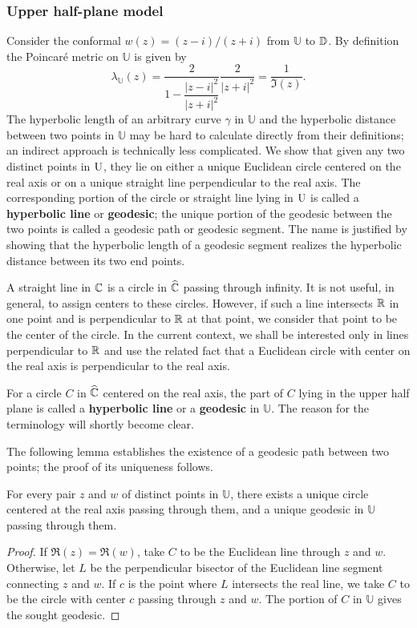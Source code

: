 \subsubsection{Upper half-plane model}
Consider the conformal $w(z)=(z-i)/(z+i)$ from $\mathbb{U}$ to $\mathbb{D}$. By definition the Poincar\'e metric on $\mathbb{U}$ is given by
\[\lambda_{\mathbb{U}}(z)=\frac{2}{1-\dfrac{|z-i|^2}{|z+i|^2}}\frac{2}{|z+i|^2}=\frac{1}{\Im(z)}.\]
The hyperbolic length of an arbitrary curve $\gamma$ in $\mathbb{U}$ and the hyperbolic distance between two points in $\mathbb{U}$ may be hard to calculate directly from their definitions; an indirect approach is technically less complicated. We show that given any two distinct points in $\mathrm{U}$, they lie on either a unique Euclidean circle centered on the real axis or on a unique straight line perpendicular to the real axis. The corresponding portion of the circle or straight line lying in $\mathrm{U}$ is called a \textbf{hyperbolic line} or \textbf{geodesic}; the unique portion of the geodesic between the two points is called a geodesic path or geodesic segment. The name is justified by showing that the hyperbolic length of a geodesic segment realizes the hyperbolic distance between its two end points.\par
A straight line in $\mathbb{C}$ is a circle in $\widehat{\mathbb{C}}$ passing through infinity. It is not useful, in general, to assign centers to these circles. However, if such a line intersects $\mathbb{R}$ in one point and is perpendicular to $\mathbb{R}$ at that point, we consider that point to be the center of the circle. In the current context, we shall be interested only in lines perpendicular to $\mathbb{R}$ and use the related fact that a Euclidean circle with center on the real axis is perpendicular to the real axis.
\begin{definition}
For a circle $C$ in $\widehat{\mathbb{C}}$ centered on the real axis, the part of $C$ lying in the upper half plane is called a \textbf{hyperbolic line} or a \textbf{geodesic} in $\mathbb{U}$. The reason for the terminology will shortly become clear.
\end{definition}
The following lemma establishes the existence of a geodesic path between two points; the proof of its uniqueness follows.
\begin{lemma}
For every pair $z$ and $w$ of distinct points in $\mathbb{U}$, there exists a unique circle centered at the real axis passing through them, and a unique geodesic in $\mathbb{U}$ passing through them.
\end{lemma}
\begin{proof}
If $\Re(z)=\Re(w)$, take $C$ to be the Euclidean line through $z$ and $w$. Otherwise, let $L$ be the perpendicular bisector of the Euclidean line segment connecting $z$ and $w$. If $c$ is the point where $L$ intersects the real line, we take $C$ to be the circle with center $c$ passing through $z$ and $w$. The portion of $C$ in $\mathbb{U}$ gives the sought geodesic.
\end{proof}
